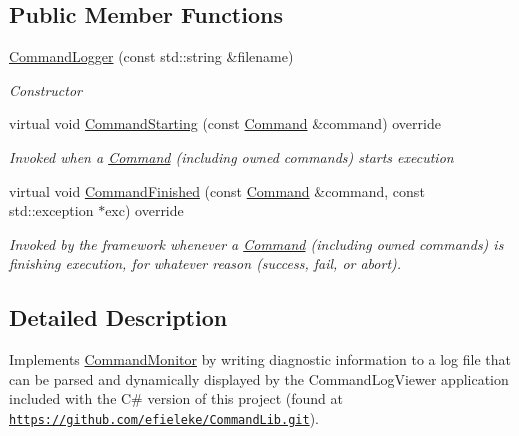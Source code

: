 \subsection*{Public Member Functions}
\begin{DoxyCompactItemize}
\item 
\mbox{\hyperlink{class_command_lib_1_1_command_logger_ac655a681d1601506900d1a9e879a09e3}{Command\+Logger}} (const std\+::string \&filename)
\begin{DoxyCompactList}\small\item\em Constructor\end{DoxyCompactList}\item 
\mbox{\label{class_command_lib_1_1_command_logger_af0094fb705c199e54cf81f3d0accdbf3}} 
virtual void \mbox{\hyperlink{class_command_lib_1_1_command_logger_af0094fb705c199e54cf81f3d0accdbf3}{Command\+Starting}} (const \mbox{\hyperlink{class_command_lib_1_1_command}{Command}} \&command) override
\begin{DoxyCompactList}\small\item\em Invoked when a \mbox{\hyperlink{class_command_lib_1_1_command}{Command}} (including owned commands) starts execution  \end{DoxyCompactList}\item 
\mbox{\label{class_command_lib_1_1_command_logger_a445d24aff515f378c9cf3daacd980e22}} 
virtual void \mbox{\hyperlink{class_command_lib_1_1_command_logger_a445d24aff515f378c9cf3daacd980e22}{Command\+Finished}} (const \mbox{\hyperlink{class_command_lib_1_1_command}{Command}} \&command, const std\+::exception $\ast$exc) override
\begin{DoxyCompactList}\small\item\em Invoked by the framework whenever a \mbox{\hyperlink{class_command_lib_1_1_command}{Command}} (including owned commands) is finishing execution, for whatever reason (success, fail, or abort).  \end{DoxyCompactList}\end{DoxyCompactItemize}


\subsection{Detailed Description}
Implements \mbox{\hyperlink{class_command_lib_1_1_command_monitor}{Command\+Monitor}} by writing diagnostic information to a log file that can be parsed and dynamically displayed by the Command\+Log\+Viewer application included with the C\# version of this project (found at \href{https://github.com/efieleke/CommandLib.git}{\tt https\+://github.\+com/efieleke/\+Command\+Lib.\+git}). 



